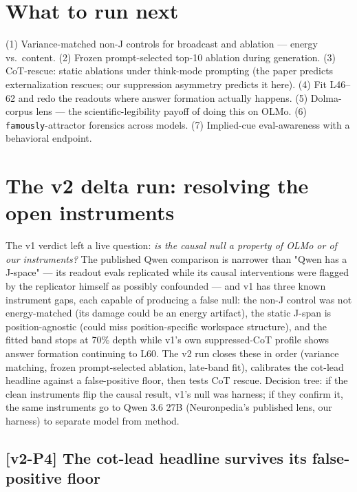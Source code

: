 \documentclass[10pt]{article}
\newcommand{\code}[1]{\texttt{#1}}
\begin{document}
\section{What to run next}

(1) Variance-matched non-J controls for broadcast and ablation --- energy
vs.\ content. (2) Frozen prompt-selected top-10 ablation during generation.
(3) CoT-rescue: static ablations under think-mode prompting (the paper
predicts externalization rescues; our suppression asymmetry predicts it
here). (4) Fit L46--62 and redo the readouts where answer formation actually
happens. (5) Dolma-corpus lens --- the scientific-legibility payoff of doing
this on OLMo. (6) \code{famously}-attractor forensics across models.
(7) Implied-cue eval-awareness with a behavioral endpoint.

\section{The v2 delta run: resolving the open instruments}
\label{sec:v2}

The v1 verdict left a live question: \emph{is the causal null a property of
OLMo or of our instruments?} The published Qwen comparison is narrower than
"Qwen has a J-space" --- its readout evals replicated while its causal
interventions were flagged by the replicator himself as possibly confounded
--- and v1 has three known instrument gaps, each capable of producing a
false null: the non-J control was not energy-matched (its damage could be an
energy artifact), the static J-span is position-agnostic (could miss
position-specific workspace structure), and the fitted band stops at 70\%
depth while v1's own suppressed-CoT profile shows answer formation
continuing to L60. The v2 run closes these in order (variance matching,
frozen prompt-selected ablation, late-band fit), calibrates the cot-lead
headline against a false-positive floor, then tests CoT rescue. Decision
tree: if the clean instruments flip the causal result, v1's null was
harness; if they confirm it, the same instruments go to Qwen 3.6 27B
(Neuronpedia's published lens, our harness) to separate model from method.

\subsection{[v2-P4] The cot-lead headline survives its false-positive floor}
\end{document}
